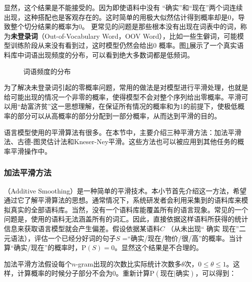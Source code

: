 \parinterval 显然，这个结果是不能接受的。因为即使语料中没有 ``确实''和``现在''两个词连续出现，这种搭配也是客观存在的。这时简单的用极大似然估计得到概率却是0，导致整个切分结果的概率为0。 更常见的问题是那些根本没有出现在词表中的词，称为{\small\sffamily\bfseries{未登录词}}（Out-of-Vocabulary Word，OOV Word），比如一些生僻词，可能模型训练阶段从来没有看到过，这时模型仍然会给出0 概率。图\ref{fig:2-18}展示了一个真实语料库中词语出现频度的分布，可以看到绝大多数词都是低频词。

\begin{figure}[htp]
    \centering

	 \caption{词语频度的分布}
    \label{fig:2-18}
\end{figure}

\parinterval 为了解决未登录词引起的零概率问题，常用的做法是对模型进行平滑处理，也就是给可能出现的情况一个非零的概率，使得模型不会对整个序列给出零概率。平滑可以用``劫富济贫''这一思想理解，在保证所有情况的概率和为1的前提下，使极低概率的部分可以从高概率的部分分配到一部分概率，从而达到平滑的目的。

\parinterval 语言模型使用的平滑算法有很多。在本节中，主要介绍三种平滑方法：加法平滑法、古德-图灵估计法和Kneser-Ney平滑。这些方法也可以被应用到其他任务的概率平滑操作中。


\subsubsection{加法平滑方法}

（Additive Smoothing）是一种简单的平滑技术。本小节首先介绍这一方法，希望通过它了解平滑算法的思想。通常情况下，系统研发者会利用采集到的语料库来模拟真实的全部语料库。当然，没有一个语料库能覆盖所有的语言现象。常见的一个问题是，使用的语料无法涵盖所有的词汇。因此，直接依据这样语料所获得的统计信息来获取语言模型就会产生偏差。假设依据某语料$C$ （从未出现`` 确实 现在''二元语法），评估一个已经分好词的句子$S$ =``确实/现在/物价/很/高''的概率。当计算``确实/现在''的概率时，$\textrm{P}(S) = 0$。显然这个结果是不合理的。

\parinterval 加法平滑方法假设每个$n$-gram出现的次数比实际统计次数多$\theta$次，$0 \le \theta\le 1$。这样，计算概率的时候分子部分不会为0。重新计算$\textrm{P}(\textrm{现在}|\textrm{确实})$，可以得到：

